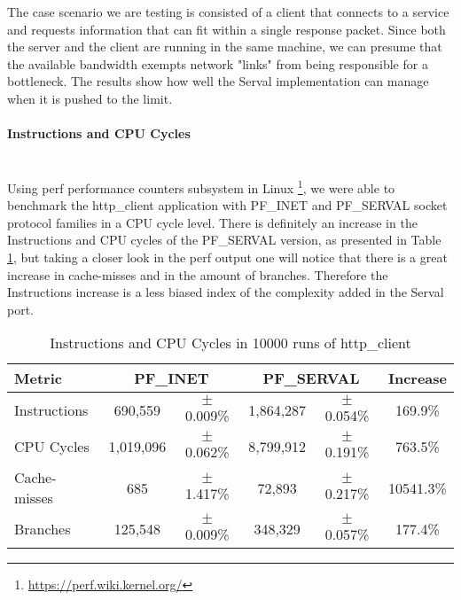 The case scenario we are testing is consisted of a client that connects to a service and requests information that can fit within a single response packet.
Since both the server and the client are running in the same machine, we can presume that the available bandwidth exempts network "links" from being responsible for a bottleneck.
The results show how well the Serval implementation can manage when it is pushed to the limit.



\newpage
\paragraph{Instructions and CPU Cycles} \hfill \\
Using perf performance counters subsystem in Linux \footnote{\url{https://perf.wiki.kernel.org/}}, we were able to benchmark the http\_client application with PF\_INET and PF\_SERVAL socket protocol families in a CPU cycle level.
There is definitely an increase in the Instructions and CPU cycles of the PF\_SERVAL version, as presented in Table \ref{table:cpu}, but taking a closer look in the perf output one will notice that there is a great increase in cache-misses and in the amount of branches.
Therefore the Instructions increase is a less biased index of the complexity added in the Serval port.
\begin{table}
\begin{center}
  \begin{tabular}{l||cc|cc|c}
  	\toprule
  	Metric			&	\multicolumn{2}{c}{PF\_INET}	&	\multicolumn{2}{c}{PF\_SERVAL}	&	Increase	\\
  	\midrule
    Instructions	&	690,559		&	$\pm$0.009\%	&	1,864,287	&	$\pm$0.054\%	&	169.9\%		\\
    CPU Cycles		&	1,019,096	&	$\pm$0.062\%	&	8,799,912	&	$\pm$0.191\%	&	763.5\%		\\
    Cache-misses	&	685			&	$\pm$1.417\%	&	72,893		&	$\pm$0.217\%	&	10541.3\%		\\
    Branches		&	125,548		&	$\pm$0.009\%	&	348,329		&	$\pm$0.057\%	&	177.4\%		\\
    \bottomrule
  \end{tabular}
  \caption[Benchmark: Instructions and CPU Cycles]{Instructions and CPU Cycles in 10000 runs of http\_client}
  \label{table:cpu}
\end{center}
\end{table}



